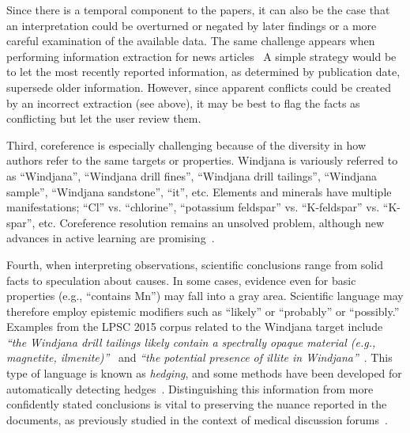 \documentclass[letterpaper]{article}
\begin{document}
Since there is a temporal component to the papers, it can also be the
case that an interpretation could be overturned or negated by later
findings or a more careful examination of the available data.  The
same challenge appears when performing information extraction for 
news articles~\cite{mckeown:news95,ji:infofusion10}
%
A simple strategy would be to let the most recently reported
information, as determined by publication date, supersede older
information.  However, since apparent conflicts could be created by an
incorrect extraction (see above), it may be best to flag the facts as
conflicting but let the user review them. 

Third, coreference is especially challenging because of the diversity
in how authors refer to the same targets or properties.  Windjana is
variously referred to as ``Windjana'', ``Windjana drill fines'',
``Windjana drill tailings'', ``Windjana sample'', ``Windjana
sandstone'', ``it'', etc.  Elements and minerals have multiple
manifestations; ``Cl'' vs. ``chlorine'', ``potassium feldspar''
vs. ``K-feldspar'' vs. ``K-spar'', etc.  Coreference resolution
remains an unsolved problem, although new advances in active learning
are promising~\cite{sachan:coref15}.

Fourth, when interpreting observations, scientific conclusions range
from solid facts to speculation about causes.  In some cases, evidence
even for basic properties (e.g., ``contains Mn'') may fall into a gray
area.  Scientific language may therefore employ epistemic modifiers
such as ``likely'' or ``probably'' or ``possibly.''  Examples from the
LPSC 2015 corpus related to the Windjana target include {\em ``the
Windjana drill tailings likely contain a spectrally opaque material
(e.g., magnetite, ilmenite)''}~\cite{johnson:ferric15} and {\em ``the
potential presence of illite in Windjana''}~\cite{rampe:cement15}.
This type of language is known as {\em hedging}, and some methods have
been developed for automatically detecting
hedges~\cite{medlock:hedge07,agarwal:hedge10}.  
Distinguishing this information from more confidently stated
conclusions is vital to preserving the nuance reported in the
documents, as previously studied in the context of medical discussion
forums~\cite{sokolova:epistemic13}.
%
\end{document}
